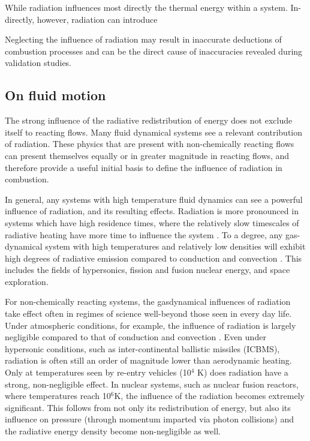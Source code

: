 While radiation influences most directly the thermal energy within a system. In-directly, however, radiation can introduce 


Neglecting the influence of radiation may result in inaccurate deductions of combustion processes and can be the direct cause of inaccuracies revealed during validation studies.



\subsection{On fluid motion}
The strong influence of the radiative redistribution of energy does not exclude itself to reacting flows. Many fluid dynamical systems see a relevant contribution of radiation. These physics that are present with non-chemically reacting flows can present themselves equally or in greater magnitude in reacting flows, and therefore provide a useful initial basis to define the influence of radiation in combustion. 

In general, any systems with high temperature fluid dynamics can see a powerful influence of radiation, and its resulting effects. 
Radiation is more pronounced in systems which have high residence times, where the relatively slow timescales of radiative heating have more time to influence the system \cite{Wu2021LimitationsFires}. 
To a degree, any gas-dynamical system with high temperatures and relatively low densities will exhibit high degrees of radiative emission compared to conduction and convection \cite{Pai1966RadiationDynamics}. This includes the fields of hypersonics, fission and fusion nuclear energy, and space exploration.

For non-chemically reacting systems, the gasdynamical influences of radiation take effect often in regimes of science well-beyond those seen in every day life. Under atmospheric conditions, for example, the influence of radiation is largely negligible compared to that of conduction and convection \cite{Pai1966RadiationDynamics}.
Even under hypersonic conditions, such as inter-continental ballistic missiles (ICBMS), radiation is often still an order of magnitude lower than aerodynamic heating. Only at temperatures seen by re-entry vehicles (10$^4$ K) does radiation have a strong, non-negligible effect.
In nuclear systems, such as nuclear fusion reactors, where temperatures reach 10$^6$K, the influence of the radiation becomes extremely significant. This follows from not only its redistribution of energy, but also its influence on pressure (through momentum imparted via photon collisions) and the radiative energy density become non-negligible as well. 



